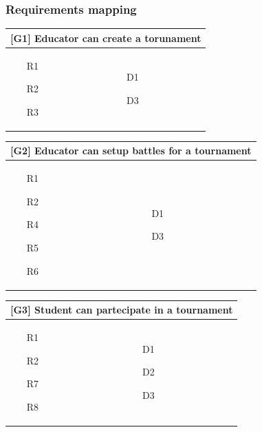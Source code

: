 \subsubsection{Requirements mapping}
\begin{tabular}{|p{6cm}|p{6cm}|}
    \hline
    \multicolumn{2}{|c|}{[G1] Educator can create a torunament} \\
    \hline
    \begin{itemize}
        \item [R1]
        \item [R2]
        \item [R3]
    \end{itemize}
    &
    \begin{itemize}
        \item [D1]
        \item [D3]
    \end{itemize}
    \\
    \hline
\end{tabular}

\begin{tabular}{|p{6cm}|p{6cm}|}
    \hline
    \multicolumn{2}{|c|}{[G2] Educator can setup battles for a tournament} \\
    \hline
    \begin{itemize}
        \item [R1]
        \item [R2]
        \item [R4]
        \item [R5]
        \item [R6]
    \end{itemize}
    &
    \begin{itemize}
        \item [D1]
        \item [D3]
    \end{itemize}
    \\
    \hline
\end{tabular}

\begin{tabular}{|p{6cm}|p{6cm}|}
    \hline
    \multicolumn{2}{|c|}{[G3] Student can partecipate in a tournament} \\
    \hline
    \begin{itemize}
        \item [R1]
        \item [R2]
        \item [R7]
        \item [R8]
    \end{itemize}
    &
    \begin{itemize}
        \item [D1]
        \item [D2]
        \item [D3]
    \end{itemize}
    \\
    \hline
\end{tabular}

